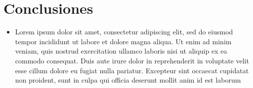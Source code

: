 \chapter*{Conclusiones}

\begin{itemize}
	\item Lorem ipsum dolor sit amet, consectetur adipiscing elit, sed do eiusmod tempor incididunt ut labore et dolore magna aliqua. Ut enim ad minim veniam, quis nostrud exercitation ullamco laboris nisi ut aliquip ex ea commodo consequat. Duis aute irure dolor in reprehenderit in voluptate velit esse cillum dolore eu fugiat nulla pariatur. Excepteur sint occaecat cupidatat non proident, sunt in culpa qui officia deserunt mollit anim id est laborum
\end{itemize}